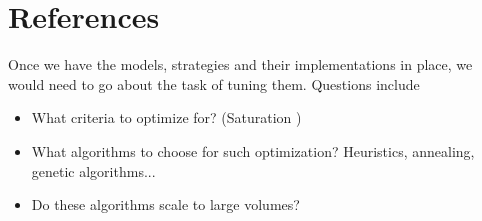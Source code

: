 \section{References}

Once we have the models, strategies and their implementations in place, we would need to go about the task of tuning them.
Questions include
\begin{itemize}
\item What criteria to optimize for? (Saturation )
\item What algorithms to choose for such optimization? Heuristics, annealing, genetic algorithms...
\item Do these algorithms scale to large volumes?
\end{itemize}

